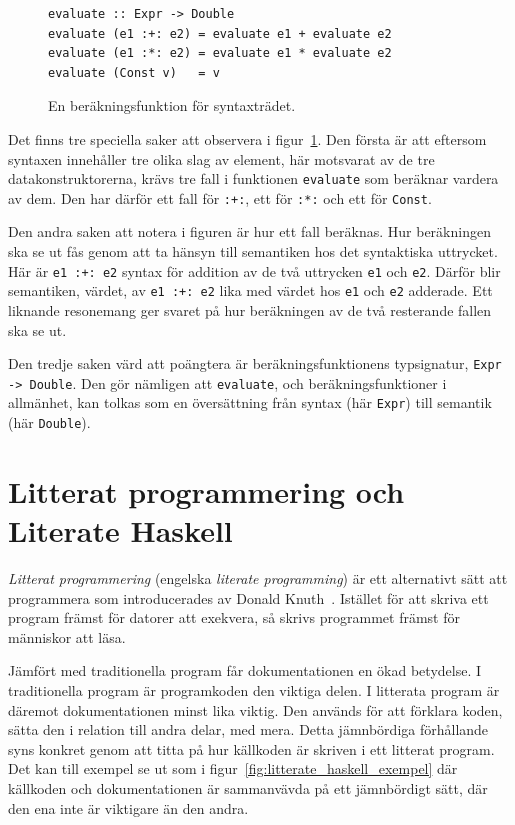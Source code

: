 \begin{figure}[tph]
  \begin{lstlisting}
evaluate :: Expr -> Double
evaluate (e1 :+: e2) = evaluate e1 + evaluate e2
evaluate (e1 :*: e2) = evaluate e1 * evaluate e2
evaluate (Const v)   = v
  \end{lstlisting}
  \caption{En beräkningsfunktion för syntaxträdet.}\label{fig:eval_tree}
\end{figure}

Det finns tre speciella saker att observera i
figur~\ref{fig:eval_tree}. Den första är att eftersom syntaxen innehåller tre olika
slag av element, här motsvarat av de tre datakonstruktorerna, krävs tre fall i
funktionen \texttt{evaluate} som beräknar vardera av dem. Den har
därför ett fall för \texttt{:+:}, ett för \texttt{:*:} och ett för
\texttt{Const}.

Den andra saken att notera i figuren är hur ett fall
beräknas. Hur beräkningen ska se ut fås genom att ta hänsyn till
semantiken hos det syntaktiska uttrycket. Här är \texttt{e1 :+: e2} syntax för
addition av de två uttrycken \texttt{e1} och \texttt{e2}. Därför blir
semantiken, värdet, av \texttt{e1 :+: e2} lika med värdet hos \texttt{e1} och
\texttt{e2} adderade. Ett liknande resonemang ger svaret på hur beräkningen av
de två resterande fallen ska se ut.

Den tredje saken värd att poängtera är beräkningsfunktionens
typsignatur, \texttt{Expr -> Double}. Den gör nämligen att
\texttt{evaluate}, och beräkningsfunktioner i allmänhet, kan tolkas som en översättning
från syntax (här \texttt{Expr}) till semantik (här \texttt{Double}).

\section{Litterat programmering och Literate Haskell}\label{sec:lhs}

\textit{Litterat programmering} (engelska \textit{literate programming}) är ett
alternativt sätt att programmera som introducerades av Donald Knuth~\cite{knuth}.
Istället för att skriva ett program främst för datorer att exekvera, så skrivs
programmet främst för människor att läsa.

Jämfört med traditionella program får dokumentationen en
ökad betydelse. I traditionella program är programkoden den viktiga delen. I
litterata program är däremot dokumentationen minst lika viktig. Den används för
att förklara koden, sätta den i relation till andra delar, med mera.
Detta jämnbördiga förhållande syns konkret genom att titta på hur källkoden är
skriven i ett litterat program. Det kan till exempel se ut som i
figur~\ref{fig:litterate_haskell_exempel} där källkoden och
dokumentationen är sammanvävda på ett jämnbördigt sätt, där den ena inte är
viktigare än den andra.

